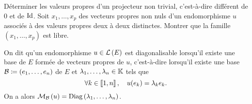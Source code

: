 \documentclass{magnolia}
\begin{document}

\begin{exos}
\exo Déterminer les valeurs propres d'un projecteur non trivial, c'est-à-dire
  différent de $0$ et de $\operatorname{Id}$.
\exo Soit $x_1,\ldots,x_p$ des vecteurs propres non nuls d'un endomorphisme $u$
  associés à des valeurs propres deux à deux distinctes. Montrer que la
  famille $(x_1,\ldots,x_p)$ est libre.
\end{exos}

On dit qu'un endomorphisme $u\in\mathcal{L}\left(E\right)$ est diagonalisable lorsqu'il existe une base de
$E$ formée de vecteurs propres de $u$, c'est-à-dire lorsqu'il existe une base
$\mathcal{B}\coloneqq(e_1,\ldots,e_n)$ de $E$ et $\lambda_1,\ldots,\lambda_n\in\mathbb{K}$ tels que
\[\forall k\in\left\llbracket 1,n\right\rrbracket,\quad u(e_k)=\lambda_k e_k.\]
On a alors $\mathcal{M}_{\mathcal{B}}\left(u\right)=\mathop{\rm{Diag}}\left(\lambda_1,\ldots,\lambda_n\right)$.\\
\end{document}
